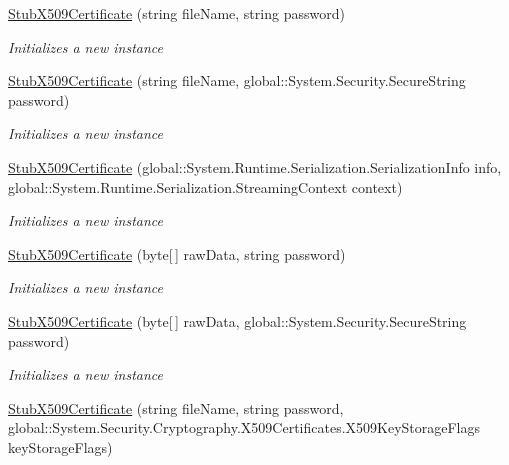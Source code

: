 \begin{DoxyCompactItemize}
\hyperlink{class_system_1_1_security_1_1_cryptography_1_1_x509_certificates_1_1_fakes_1_1_stub_x509_certificate_ad83c3fd62fd1f7f71a88f459cc7a813b}{Stub\-X509\-Certificate} (string file\-Name, string password)
\begin{DoxyCompactList}\small\item\em Initializes a new instance\end{DoxyCompactList}\item 
\hyperlink{class_system_1_1_security_1_1_cryptography_1_1_x509_certificates_1_1_fakes_1_1_stub_x509_certificate_a3cc0ca2ce7aa9b778af94807ac0367c8}{Stub\-X509\-Certificate} (string file\-Name, global\-::\-System.\-Security.\-Secure\-String password)
\begin{DoxyCompactList}\small\item\em Initializes a new instance\end{DoxyCompactList}\item 
\hyperlink{class_system_1_1_security_1_1_cryptography_1_1_x509_certificates_1_1_fakes_1_1_stub_x509_certificate_ae02f7a3f90a17256b246c2fe7be55c75}{Stub\-X509\-Certificate} (global\-::\-System.\-Runtime.\-Serialization.\-Serialization\-Info info, global\-::\-System.\-Runtime.\-Serialization.\-Streaming\-Context context)
\begin{DoxyCompactList}\small\item\em Initializes a new instance\end{DoxyCompactList}\item 
\hyperlink{class_system_1_1_security_1_1_cryptography_1_1_x509_certificates_1_1_fakes_1_1_stub_x509_certificate_a9b337a945ce514a8b5a6bbd6faa75903}{Stub\-X509\-Certificate} (byte\mbox{[}$\,$\mbox{]} raw\-Data, string password)
\begin{DoxyCompactList}\small\item\em Initializes a new instance\end{DoxyCompactList}\item 
\hyperlink{class_system_1_1_security_1_1_cryptography_1_1_x509_certificates_1_1_fakes_1_1_stub_x509_certificate_a1e5675ad4f94be170f9e035f766339c9}{Stub\-X509\-Certificate} (byte\mbox{[}$\,$\mbox{]} raw\-Data, global\-::\-System.\-Security.\-Secure\-String password)
\begin{DoxyCompactList}\small\item\em Initializes a new instance\end{DoxyCompactList}\item 
\hyperlink{class_system_1_1_security_1_1_cryptography_1_1_x509_certificates_1_1_fakes_1_1_stub_x509_certificate_ad80f422b6979fb796294d8fad38ce70f}{Stub\-X509\-Certificate} (string file\-Name, string password, global\-::\-System.\-Security.\-Cryptography.\-X509\-Certificates.\-X509\-Key\-Storage\-Flags key\-Storage\-Flags)

\end{DoxyCompactItemize}
